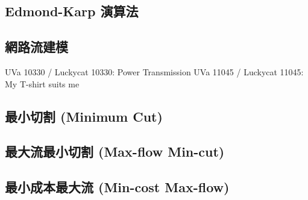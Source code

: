 \documentclass[12pt,a4paper,oneside]{report}
\begin{document}
\begin{CJK}{UTF8}{bkai}
\subsection{Edmond-Karp 演算法}
\subsection{網路流建模}

UVa 10330 / Luckycat 10330: Power Transmission
UVa 11045 / Luckycat 11045: My T-shirt suits me

\subsection{最小切割 (Minimum Cut)}
\subsection{最大流最小切割 (Max-flow Min-cut)}
\subsection{最小成本最大流 (Min-cost Max-flow)}
\ifx \allfiles \undefined
\printindex[noun]

\clearpage
\end{CJK}
\end{document}
